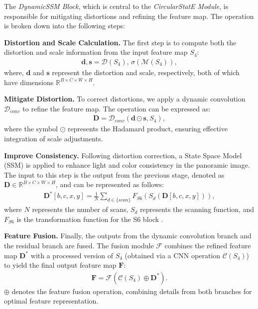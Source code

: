 %

The \emph{DynamicSSM Block}, which is central to the \emph{CircularStatE Module}, is responsible for mitigating distortions and refining the feature map. The operation is broken down into the following steps: 
\label{mod:DynamicSSM}

\noindent \textbf{Distortion and Scale Calculation.} The first step is to compute both the {distortion} and {scale} information from the input feature map \( S_4 \):
\begin{align}
\mathbf{d}, \mathbf{s} = \mathcal{D}(S_4), \, \sigma(\mathcal{M}(S_4)),
\end{align}
where, \( \mathbf{d} \) and \( \mathbf{s} \) represent the distortion and scale, respectively, both of which have dimensions \( \mathbb{R}^{B \times C \times W \times H} \).

\noindent \textbf{Mitigate Distortion.} To correct distortions, we apply a dynamic convolution \( \mathcal{D}_{conv} \) to refine the feature map. The operation can be expressed as:
\begin{align}
\mathbf{D} = \mathcal{D}_{conv}(\mathbf{d} \odot \mathbf{s}, S_4),
\end{align}
where the symbol $\odot$ represents the Hadamard product, ensuring effective integration of scale adjustments.

\noindent \textbf{Improve Consistency.}
%
Following distortion correction, a State Space Model (SSM) \cite{mamba2} is applied to enhance light and color consistency in the panoramic image. The input to this step is the output from the previous stage, denoted as \(\mathbf{D}{\in}\mathbb{R}^{B\times C\times W\times H}\), and can be represented as follows:
\begin{align}
{\mathbf{D^\ast}}[b,c,x,y]=\frac{1}{N}\sum_{d\in\{scan\}}F_{S6}(S_d(\mathbf{D}[b,c,x,y])),
\end{align}
where \(N\) represents the number of scans, \(S_d\) represents the scanning function, and \(F_{S6}\) is the transformation function for the S6 block \cite{mamba2}.

\noindent \textbf{Feature Fusion.}
Finally, the outputs from the dynamic convolution branch and the residual branch are fused. The fusion module \( \mathcal{F} \) combines the refined feature map \( {\mathbf{D^\ast}}\) with a processed version of \( S_4 \) (obtained via a CNN operation \( \mathcal{C}(S_4) \)) to yield the final output feature map \( \mathbf{F} \):
\begin{align}
\mathbf{F} = \mathcal{F}(\mathcal{C}(S_4) \oplus {\mathbf{D^\ast}}).
\end{align}
\( \oplus \) denotes the feature fusion operation, combining details from both branches for optimal feature representation.

%